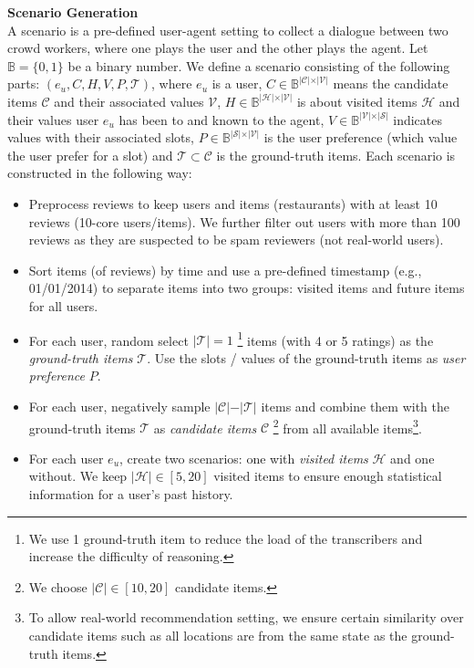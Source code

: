 \textbf{Scenario Generation}\\
\label{chap6:sec:scenario}
A scenario is a pre-defined user-agent setting to collect a dialogue between two crowd workers, where one plays the user and the other plays the agent.
Let $\mathbb{B}=\{0, 1\}$ be a binary number.
We define a scenario consisting of the following parts: $(e_u, C, H, V, P, \mathcal{T} )$, where $e_u$ is a user, $C \in \mathbb{B}^{\vert \mathcal{C} \vert \times \vert \mathcal{V} \vert}$ means the candidate items $\mathcal{C}$ and their associated values $\mathcal{V}$, $H \in \mathbb{B}^{\vert \mathcal{H} \vert \times \vert \mathcal{V} \vert}$ is about visited items $\mathcal{H}$ and their values user $e_u$ has been to and known to the agent, $V \in \mathbb{B}^{\vert \mathcal{V} \vert \times \vert \mathcal{S} \vert}$ indicates values with their associated slots, $P \in \mathbb{B}^{\vert \mathcal{S} \vert \times \vert \mathcal{V} \vert} $ is the user preference (which value the user prefer for a slot) and $\mathcal{T} \subset \mathcal{C}$ is the ground-truth items. 
Each scenario is constructed in the following way:
\begin{itemize}
\setlength\itemsep{0.1em}
    \item Preprocess reviews to keep users and items (restaurants) with at least 10 reviews (10-core users/items). 
    We further filter out users with more than 100 reviews as they are suspected to be spam reviewers (not real-world users).
    \item Sort items (of reviews) by time and use a pre-defined timestamp (e.g.,  01/01/2014) to separate items into two groups: visited items and future items for all users.
    \item For each user, random select $\vert \mathcal{T} \vert = 1$ \footnote{We use 1 ground-truth item to reduce the load of the transcribers and increase the difficulty of reasoning.} items (with 4 or 5 ratings) as the \textit{ground-truth items} $\mathcal{T}$. Use the slots / values of the ground-truth items as \textit{user preference} $P$.
    \item For each user, negatively sample $\vert \mathcal{C} \vert - \vert \mathcal{T} \vert $ items and combine them with the ground-truth items $\mathcal{T}$ as \textit{candidate items} $\mathcal{C}$ \footnote{We choose $\vert \mathcal{C} \vert \in [10, 20]$ candidate items.} from all available items\footnote{To allow real-world recommendation setting, we ensure certain similarity over candidate items such as all locations are from the same state as the ground-truth items.}.
    \item For each user $e_u$, create two scenarios: one with \textit{visited items} $\mathcal{H}$ and one without. We keep $\vert \mathcal{H} \vert \in [5, 20]$ visited items to ensure enough statistical information for a user's past history.
\end{itemize}

